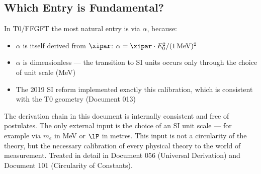 \subsection{Which Entry is Fundamental?}

In T0/FFGFT the most natural entry is via $\alpha$, because:
\begin{itemize}
	\item $\alpha$ is itself derived from $\xipar$: $\alpha = \xipar \cdot E_0^2 / (1\,\text{MeV})^2$
	\item $\alpha$ is dimensionless — the transition to SI units occurs only through the choice of unit scale (MeV)
	\item The 2019 SI reform implemented exactly this calibration, which is consistent with the T0 geometry (Document 013)
\end{itemize}

\begin{keyresult}
The derivation chain in this document is internally consistent and free of postulates. The only external input is the choice of an SI unit scale — for example via $m_e$ in MeV or $\lP$ in metres. This input is not a circularity of the theory, but the necessary calibration of every physical theory to the world of measurement. Treated in detail in Document 056 (Universal Derivation) and Document 101 (Circularity of Constants).
\end{keyresult}
